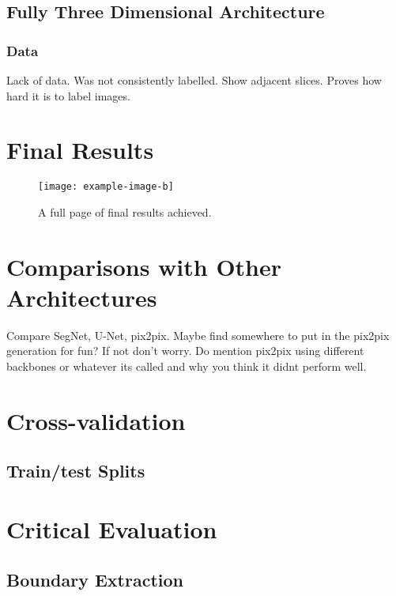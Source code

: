 \subsection{Fully Three Dimensional Architecture}

\subsubsection{Data}

Lack of data. Was not consistently labelled. Show adjacent slices. Proves how hard it is to label images.

\section{Final Results}

\begin{figure}[!p]
    \centering
    \texttt{[image: example-image-b]}
    \caption{A full page of final results achieved.}
    \label{fig:finalresults}
\end{figure}

\section{Comparisons with Other Architectures}

Compare SegNet, U-Net, pix2pix. Maybe find somewhere to put in the pix2pix generation for fun? If not don't worry. Do mention pix2pix using different backbones or whatever its called and why you think it didnt perform well.

\section{Cross-validation}
\label{sec:evalcrossval}

\subsection{Train/test Splits}

\section{Critical Evaluation}

\subsection{Boundary Extraction}

